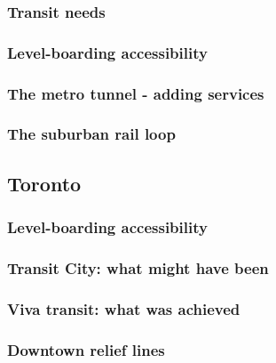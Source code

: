 \documentclass[numbered]{trbunofficial}
\begin{document}
\hypertarget{transit-needs}{%
\subsubsection{Transit needs}\label{transit-needs}}

\hypertarget{level-boarding-accessibility}{%
\subsubsection{Level-boarding
accessibility}\label{level-boarding-accessibility}}

\hypertarget{the-metro-tunnel---adding-services}{%
\subsubsection{The metro tunnel - adding
services}\label{the-metro-tunnel---adding-services}}

\hypertarget{the-suburban-rail-loop}{%
\subsubsection{The suburban rail loop}\label{the-suburban-rail-loop}}

\hypertarget{toronto}{%
\subsection{Toronto}\label{toronto}}

\hypertarget{level-boarding-accessibility-1}{%
\subsubsection{Level-boarding
accessibility}\label{level-boarding-accessibility-1}}

\hypertarget{transit-city-what-might-have-been}{%
\subsubsection{Transit City: what might have
been}\label{transit-city-what-might-have-been}}

\hypertarget{viva-transit-what-was-achieved}{%
\subsubsection{Viva transit: what was
achieved}\label{viva-transit-what-was-achieved}}

\hypertarget{downtown-relief-lines}{%
\subsubsection{Downtown relief lines}\label{downtown-relief-lines}}
\end{document}
